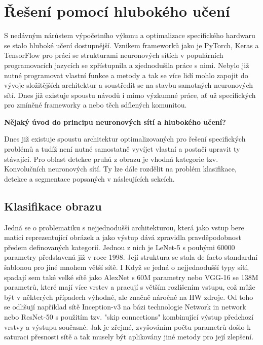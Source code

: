 \documentclass[czech, bc, kky, he, iso690alph]{fasthesis}
\begin{document}
        \section{Řešení pomocí hlubokého učení}
        	S nedávným nárůstem výpočetního výkonu a optimalizace specifického hardwaru se stalo hluboké učení dostupnější. Vznikem frameworků jako je PyTorch, Keras a TensorFlow pro práci se strukturami neuronových sítích v populárních programovacích jazycích se zpřístupnila a zjednodušila práce s nimi. Nebylo již nutné programovat vlastní funkce a metody a tak se více lidí mohlo zapojit do vývoje složitějších architektur a soustředit se na stavbu samotných neuronových sítí. Dnes již existuje spoustu návodů i mimo výzkumné práce, ať už specifických pro zmíněné frameworky a nebo těch sdílených komunitou.
            
            \textbf{Nějaký úvod do principu neuronových sítí a hlubokého učení?}
            
           	Dnes již existuje spoustu architektur optimalizovaných pro řešení specifických problémů a tudíž není nutné samostatně vyvíjet vlastní a postačí upravit ty stávající. Pro oblast detekce pruhů z obrazu je vhodná kategorie tzv. Konvolučních neuronových sítí. Ty lze dále rozdělit na problém klasifikace, detekce a segmentace popsaných v násleujících sekcích.
           	
           	\subsection{Klasifikace obrazu} \label{subsec:klasifikace_obrazu}
           		Jedná se o problematiku s nejjednodušší architekturou, která jako vstup bere matici reprezentující obrázek a jako výstup dává zpravidla pravděpodobnost předem definovaných kategorií. Jednou z nich je LeNet-5 \cite{LeNet-5} s pouhými 60000 parametry představená již v roce 1998. Její struktura se stala de facto standardní šablonou pro jiné mnohem větší sítě. I Když se jedná o nejjednodušší typy sítí, spadají sem také velké sítě jako AlexNet \cite{ImageNet} s 60M parametry nebo VGG-16 \cite{VGG-16} se 138M parametrů, které mají více vrstev a pracují s větším rozlišením vstupu, což může být v některých případech výhodné, ale značně náročné na HW zdroje. Od toho se odlišují například sítě Inception-v3 \cite{Inception-v3} na bázi technologie Network in network \cite{Network_in_network} nebo ResNet-50 \cite{ResNet-50} s použitím tzv. "skip connections" kombinující výstup předchozí vrstvy a výstupu současné. Jak je zřejmé, zvyšováním počtu parametrů došlo k saturaci přesnosti sítě a tak musely být aplikovány jiné metody pro její zlepšení.
           	
\end{document}

